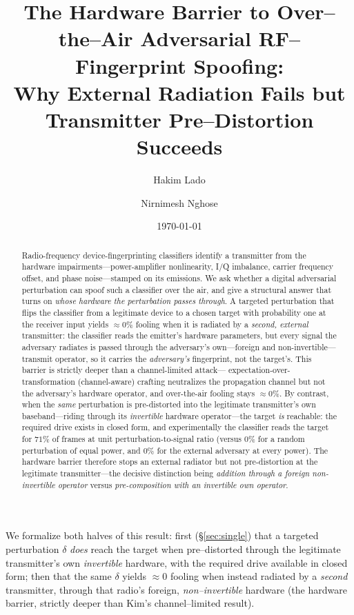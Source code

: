 \documentclass[11pt]{article}
\title{The Hardware Barrier to Over--the--Air Adversarial RF--Fingerprint Spoofing:\\
Why External Radiation Fails but Transmitter Pre--Distortion Succeeds}
\author{Hakim Lado \and Nirnimesh Nghose}
\date{\today}
\begin{document}
\maketitle

\begin{abstract}
Radio-frequency device-fingerprinting classifiers identify a transmitter from the
hardware impairments---power-amplifier nonlinearity, I/Q imbalance, carrier frequency
offset, and phase noise---stamped on its emissions. We ask whether a digital adversarial
perturbation can spoof such a classifier over the air, and give a structural answer that
turns on \emph{whose hardware the perturbation passes through}. A targeted perturbation
that flips the classifier from a legitimate device to a chosen target with probability one
at the receiver input yields $\approx\!0\%$ fooling when it is radiated by a \emph{second,
external} transmitter: the classifier reads the emitter's hardware parameters, but every
signal the adversary radiates is passed through the adversary's own---foreign and
non-invertible---transmit operator, so it carries the \emph{adversary's} fingerprint, not
the target's. This barrier is strictly deeper than a channel-limited attack---
expectation-over-transformation (channel-aware) crafting neutralizes the propagation
channel but not the adversary's hardware operator, and over-the-air fooling stays
$\approx\!0\%$. By contrast, when the \emph{same} perturbation is pre-distorted into the
legitimate transmitter's own baseband---riding through its \emph{invertible} hardware
operator---the target \emph{is} reachable: the required drive exists in closed form, and
experimentally the classifier reads the target for $71\%$ of frames at unit
perturbation-to-signal ratio (versus $0\%$ for a random perturbation of equal power, and
$0\%$ for the external adversary at every power). The hardware barrier therefore stops an
external radiator but not pre-distortion at the legitimate transmitter---the decisive
distinction being \emph{addition through a foreign non-invertible operator} versus
\emph{pre-composition with an invertible own operator}.
\end{abstract}

\noindent
We formalize both halves of this result: first (\S\ref{sec:single}) that a targeted perturbation
$\delta$ \emph{does} reach the target when pre--distorted through the legitimate transmitter's own
\emph{invertible} hardware, with the required drive available in closed form; then that the same
$\delta$ yields $\approx 0$ fooling when instead radiated by a \emph{second} transmitter, through
that radio's foreign, \emph{non--invertible} hardware (the hardware barrier, strictly deeper than
Kim's channel--limited result).
\end{document}

